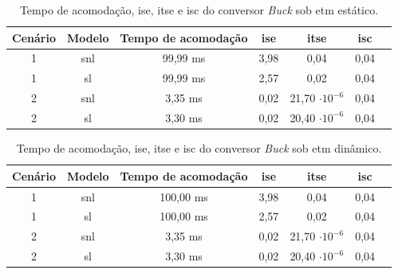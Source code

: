 \vspace{8pt}
\begin{table}[H]
  \centering
  \captionsetup{justification=centering}
  \setlength{\tabcolsep}{10pt}
  \begin{tabular}{ccccccc}
    \toprule
    Cenário & Modelo      & Tempo de acomodação & \acrshort{ise} & \acrshort{itse}       & \acrshort{isc} \\
    \midrule
    1       & \acrshort{snl}  & 99,99 ms            & 3,98           & 0,04                  & 0,04           \\
    1       & \acrshort{sl} & 99,99 ms            & 2,57           & 0,02                  & 0,04           \\
    2       & \acrshort{snl}  & 3,35 ms             & 0,02           & 21,70 $\cdot 10^{-6}$ & 0,04           \\
    2       & \acrshort{sl} & 3,30 ms             & 0,02           & 20,40 $\cdot 10^{-6}$ & 0,04           \\
    \bottomrule
  \end{tabular}
  \caption{Tempo de acomodação, \acrshort{ise}, \acrshort{itse} e \acrshort{isc} do conversor \textit{Buck} sob \acrshort{etm} estático.}
  \label{table:indices_desempenho_etm_estático}
\end{table}

\vspace{8pt}
\begin{table}[H]
  \centering
  \captionsetup{justification=centering}
  \setlength{\tabcolsep}{10pt}
  \begin{tabular}{ccccccc}
    \toprule
    Cenário & Modelo      & Tempo de acomodação & \acrshort{ise} & \acrshort{itse}       & \acrshort{isc} \\
    \midrule
    1       & \acrshort{snl}  & 100,00 ms           & 3,98           & 0,04                  & 0,04           \\
    1       & \acrshort{sl} & 100,00 ms           & 2,57           & 0,02                  & 0,04           \\
    2       & \acrshort{snl}  & 3,35 ms             & 0,02           & 21,70 $\cdot 10^{-6}$ & 0,04           \\
    2       & \acrshort{sl} & 3,30 ms             & 0,02           & 20,40 $\cdot 10^{-6}$ & 0,04           \\
    \bottomrule
  \end{tabular}
  \caption{Tempo de acomodação, \acrshort{ise}, \acrshort{itse} e \acrshort{isc} do conversor \textit{Buck} sob \acrshort{etm} dinâmico.}
  \label{table:indices_desempenho_etm_dinamico}
\end{table}

